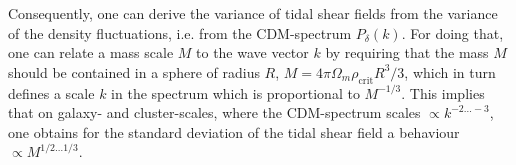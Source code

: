 \documentclass[a4paper,fleqn,usenatbib]{mnras}
\begin{document}
Consequently, one can derive the variance of tidal shear fields from the variance of the density fluctuations, i.e. from the CDM-spectrum $P_\delta(k)$. For doing that, one can relate a mass scale $M$ to the wave vector $k$ by requiring that the mass $M$ should be contained in a sphere of radius $R$, $M=4\pi\Omega_m\rho_\mathrm{crit}R^3/3$, which in turn defines a scale $k$ in the spectrum which is proportional to $M^{-1/3}$. This implies that on galaxy- and cluster-scales, where the CDM-spectrum scales $\propto k^{-2\ldots-3}$, one obtains for the standard deviation of the tidal shear field a behaviour $\propto M^{1/2\ldots 1/3}$.







\bsp	%
\label{lastpage}
\end{document}

